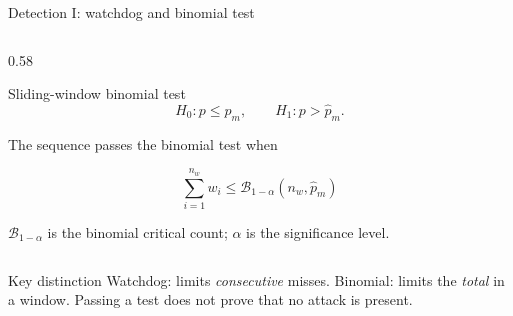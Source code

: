 \documentclass[8pt,aspectratio=169]{beamer}
\begin{document}
\begin{frame}{Detection I: watchdog and binomial test}
\begin{columns}[T,onlytextwidth]
\begin{column}{0.58\textwidth}
\begin{block}{Sliding-window binomial test}
\[
H_0:p\leq\hat p_m,
\qquad
H_1:p>\hat p_m.
\]

The sequence passes the binomial test when

\[
\boxed{
\sum_{i=1}^{n_w}w_i
\leq
\mathcal B_{1-\alpha}(n_w,\hat p_m)
}
\]

\scriptsize
$\mathcal B_{1-\alpha}$ is the binomial critical count;
$\alpha$ is the significance level.

\end{block}

\end{column}
\end{columns}

\vspace{1mm}

\begin{block}{Key distinction}
\small Watchdog: limits \emph{consecutive} misses. Binomial: limits the \emph{total} in a window. Passing a test does not prove that no attack is present.
\end{block}

\vfill
{\paperref}

\end{frame}
\end{document}
